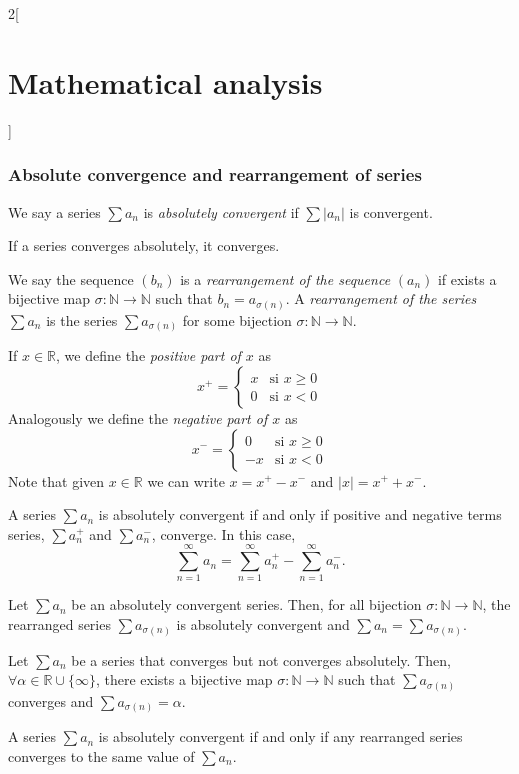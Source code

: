\documentclass[class=article,crop=false]{standalone}
\begin{document}
\begin{multicols}{2}[\section{Mathematical analysis}]
\subsubsection{Absolute convergence and rearrangement of series}
\begin{definition}
We say a series $\sum a_n$ is \textit{absolutely convergent} if $\sum |a_n|$ is convergent.
\end{definition}
\begin{theorem}
If a series converges absolutely, it converges.
\end{theorem}
\begin{definition}
We say the sequence $(b_n)$ is a \textit{rearrangement of the sequence} $(a_n)$ if exists a bijective map $\sigma:\mathbb{N}\rightarrow\mathbb{N}$ such that $b_n=a_{\sigma(n)}$. A \textit{rearrangement of the series} $\sum a_n$ is the series $\sum a_{\sigma(n)}$ for some bijection $\sigma:\mathbb{N}\rightarrow\mathbb{N}$.
\end{definition}
\begin{definition}
If $x\in\mathbb{R}$, we define the \textit{positive part of $x$} as $$x^+=
\begin{cases} 
  x & \text{si }x\geq 0 \\
  0 & \text{si }x<0 
\end{cases}$$ Analogously we define the \textit{negative part of $x$} as $$x^-=
\begin{cases} 
  0 & \text{si }x\geq 0 \\
  -x & \text{si }x<0 
\end{cases}$$ Note that given $x\in\mathbb{R}$ we can write $x=x^+-x^-$ and $|x|=x^++x^-$.
\end{definition}
\begin{theorem}
A series $\sum a_n$ is absolutely convergent if and only if positive and negative terms series, $\sum a_n^+$ and $\sum a_n^-$, converge. In this case, $$\sum_{n=1}^\infty a_n=\sum_{n=1}^\infty a_n^+-\sum_{n=1}^\infty a_n^-.$$
\end{theorem}
\begin{theorem}
Let $\sum a_n$ be an absolutely convergent series. Then, for all bijection $\sigma:\mathbb{N}\rightarrow\mathbb{N}$, the rearranged series $\sum a_{\sigma(n)}$ is absolutely convergent and $\sum a_n=\sum a_{\sigma(n)}$.
\end{theorem}
\begin{theorem}
Let $\sum a_n$ be a series that converges but not converges absolutely. Then, $\forall\alpha\in\mathbb{R}\cup\{\infty\}$, there exists a bijective map $\sigma:\mathbb{N}\rightarrow\mathbb{N}$ such that $\sum a_{\sigma(n)}$ converges and $\sum a_{\sigma(n)}=\alpha$.
\end{theorem}
\begin{theorem}
A series $\sum a_n$ is absolutely convergent if and only if any rearranged series converges to the same value of $\sum a_n$.
\end{theorem}

\end{multicols}
\end{document}
